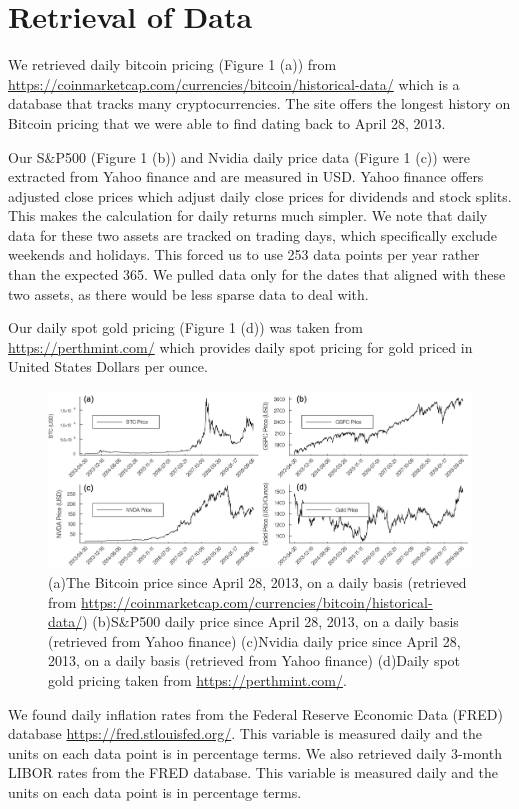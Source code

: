 \documentclass[9pt,twocolumn,twoside]{ilcss}
\begin{document}
\section{Retrieval of Data}
We retrieved daily bitcoin pricing (Figure 1 (a)) from \url{https://coinmarketcap.com/currencies/bitcoin/historical-data/} which is a database that tracks many cryptocurrencies. The site offers the longest history on Bitcoin pricing that we were able to find dating back to April 28, 2013.

Our S\&P500 (Figure 1 (b)) and Nvidia daily price data (Figure 1 (c)) were extracted from Yahoo finance and are measured in USD. Yahoo finance offers adjusted close prices which adjust daily close prices for dividends and stock splits. This makes the calculation for daily returns much simpler. We note that daily data for these two assets are tracked on trading days, which specifically exclude weekends and holidays. This forced us to use 253 data points per year rather than the expected 365. We pulled data only for the dates that aligned with these two assets, as there would be less sparse data to deal with. 

Our daily spot gold pricing (Figure 1 (d)) was taken from \url{https://perthmint.com/} which provides daily spot pricing for gold priced in United States Dollars per ounce. 

\begin{figure}
\centering
\includegraphics[width=0.9\linewidth]{fig1to4.png}
\caption{(a)The Bitcoin price since April 28, 2013, on a daily basis (retrieved from \url{https://coinmarketcap.com/currencies/bitcoin/historical-data/}) (b)S\&P500 daily price since April 28, 2013, on a daily basis (retrieved from Yahoo finance) (c)Nvidia daily price since April 28, 2013, on a daily basis (retrieved from Yahoo finance) (d)Daily spot gold pricing taken from \url{https://perthmint.com/}.}
\label{fig:1}
\end{figure}

We found daily inflation rates from the Federal Reserve Economic Data (FRED) database \url{https://fred.stlouisfed.org/}. This variable is measured daily and the units on each data point is in percentage terms. We also retrieved daily 3-month LIBOR rates from the FRED database. This variable is measured daily and the units on each data point is in percentage terms. 
\end{document}
